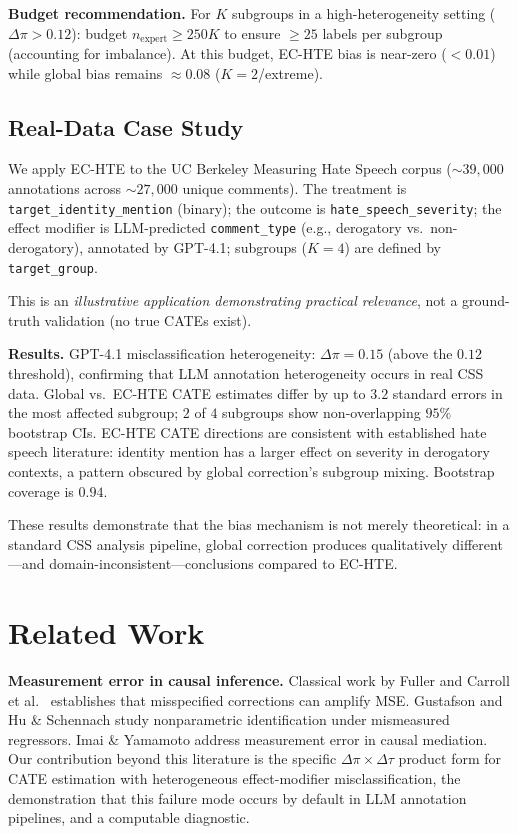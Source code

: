 \documentclass[11pt,twocolumn]{article}
\theoremstyle{remark}
\begin{document}
\textbf{Budget recommendation.}
For $K$ subgroups in a high-heterogeneity setting ($\Delta\pi > 0.12$): budget $n_{\mathrm{expert}} \geq 250K$ to ensure ${\geq}25$ labels per subgroup (accounting for imbalance).
At this budget, EC-HTE bias is near-zero ($<0.01$) while global bias remains ${\approx}0.08$ ($K{=}2$/extreme).

\subsection{Real-Data Case Study}\label{sec:realdata}

We apply EC-HTE to the UC Berkeley Measuring Hate Speech corpus \cite{kennedy2020constructing} (${\sim}39{,}000$ annotations across ${\sim}27{,}000$ unique comments).
The treatment is \texttt{target\_identity\_mention} (binary); the outcome is \texttt{hate\_speech\_severity}; the effect modifier is LLM-predicted \texttt{comment\_type} (e.g., derogatory vs.\ non-derogatory), annotated by GPT-4.1; subgroups ($K{=}4$) are defined by \texttt{target\_group}.

This is an \emph{illustrative application demonstrating practical relevance}, not a ground-truth validation (no true CATEs exist).

\textbf{Results.}
GPT-4.1 misclassification heterogeneity: $\Delta\pi = 0.15$ (above the $0.12$ threshold), confirming that LLM annotation heterogeneity occurs in real CSS data.
Global vs.\ EC-HTE CATE estimates differ by up to $3.2$ standard errors in the most affected subgroup; $2$ of $4$ subgroups show non-overlapping $95\%$ bootstrap CIs.
EC-HTE CATE directions are consistent with established hate speech literature: identity mention has a larger effect on severity in derogatory contexts, a pattern obscured by global correction's subgroup mixing.
Bootstrap coverage is $0.94$.

These results demonstrate that the bias mechanism is not merely theoretical: in a standard CSS analysis pipeline, global correction produces qualitatively different---and domain-inconsistent---conclusions compared to EC-HTE.

\section{Related Work}

\textbf{Measurement error in causal inference.}
Classical work by Fuller \cite{fuller1987measurement} and Carroll et al.\ \cite{carroll2006measurement} establishes that misspecified corrections can amplify MSE.
Gustafson \cite{gustafson2003measurement} and Hu \& Schennach \cite{hu2008instrumental} study nonparametric identification under mismeasured regressors.
Imai \& Yamamoto \cite{imai2010causal} address measurement error in causal mediation.
Our contribution beyond this literature is the specific $\Delta\pi \times \Delta\tau$ product form for CATE estimation with heterogeneous effect-modifier misclassification, the demonstration that this failure mode occurs by default in LLM annotation pipelines, and a computable diagnostic.
\end{document}
